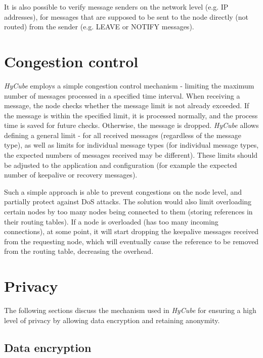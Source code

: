 It is also possible to verify message senders on the network level (e.g. IP addresses), for messages that are supposed to be sent to the node directly (not routed) from the sender (e.g. LEAVE or NOTIFY messages).






\section{Congestion control}
\label{sec:congestionControl}

\emph{HyCube} employs a simple congestion control mechanism - limiting the maximum number of messages processed in a specified time interval. When receiving a message, the node checks whether the message limit is not already exceeded. If the message is within the specified limit, it is processed normally, and the process time is saved for future checks. Otherwise, the message is dropped. \emph{HyCube} allows defining a general limit - for all received messages (regardless of the message type), as well as limits for individual message types (for individual message types, the expected numbers of messages received may be different). These limits should be adjusted to the application and configuration (for example the expected number of keepalive or recovery messages).

Such a simple approach is able to prevent congestions on the node level, and partially protect against DoS attacks. The solution would also limit overloading certain nodes by too many nodes being connected to them (storing references in their routing tables). If a node is overloaded (has too many incoming connections), at some point, it will start dropping the keepalive messages received from the requesting node, which will eventually cause the reference to be removed from the routing table, decreasing the overhead.






\section{Privacy}
\label{sec:privacy}

The following sections discuss the mechanism used in \emph{HyCube} for ensuring a high level of privacy by allowing data encryption and retaining anonymity.




\subsection{Data encryption}

